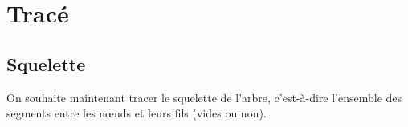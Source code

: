 \section{Tracé}
\subsection{Squelette}
On souhaite maintenant tracer le squelette de l'arbre, c'est-à-dire l'ensemble des segments entre les nœuds et leurs fils (vides ou non).

